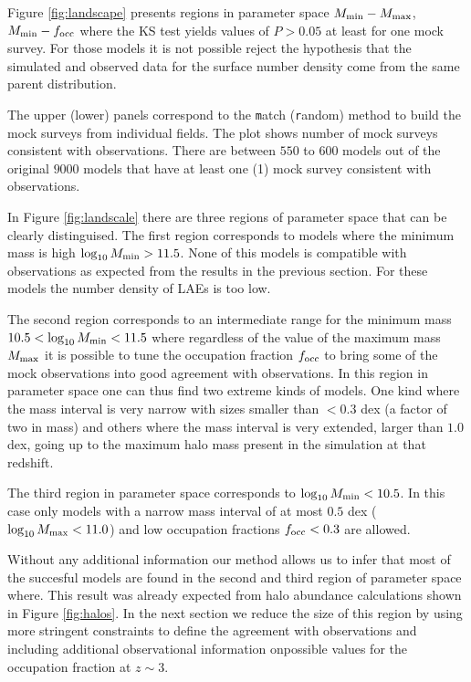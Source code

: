 \documentclass[usenatbib]{mn2e}
\begin{document}
Figure \ref{fig:landscape} presents regions in parameter space $M_{\rm
min}-M_{\rm max}$, $M_{\rm min}-f_{\rm occ}$ where the KS test yields
values of $P>0.05$ at least for one mock survey. For those models it
is not possible reject the hypothesis that the simulated and observed
data for the surface number density come from the same parent
distribution.

The upper (lower) panels correspond to the {\texttt match} ({\texttt
  random}) method to build the mock surveys from individual
fields. The plot shows number of mock surveys consistent
with observations. There are between $550$ to $600$ models out of the
original $9000$ models that have at least one (1) mock survey
consistent with observations. 


In Figure \ref{fig:landscale} there are three regions of parameter
space that can be clearly distinguised. The first region corresponds
to models where the minimum mass is high $\log_{10}M_{\rm min}>
11.5$. None of this models is compatible with observations as expected
from the results in the previous section. For these models the number
density of LAEs is too low. 

The second region corresponds to an intermediate range for the minimum
mass $10.5<\log_{10}M_{\rm min}<11.5$ where regardless of the value of
the maximum mass $M_{\rm max}$ it is possible to tune the occupation
fraction $f_{\rm occ}$ to bring some of the mock observations into
good agreement with observations. In this region in parameter space
one can thus find two extreme kinds of models.  One kind where the
mass interval is very narrow with sizes smaller than $<0.3$ dex (a
factor of two in mass) and others where the mass interval is very
extended, larger than $1.0$ dex, going up to the maximum halo mass
present in the simulation at that redshift. 


The third region in parameter space corresponds to $\log_{10}M_{\rm
  min}<10.5$. In this case only models with a narrow mass interval of
at most $0.5$ dex ($\log_{10}M_{\rm max}<11.0$) and low
occupation fractions $f_{\rm occ}<0.3$ are allowed. 

Without any additional information our method allows us to infer that
most of the succesful models are found in the second and third region of
parameter space where. This result was already expected from halo
abundance calculations shown in Figure \ref{fig:halos}. In the next
section we reduce the size of this region by using more stringent
constraints to define the agreement with observations and including
additional observational information onpossible values for the
occupation fraction at $z\sim 3$. 
\end{document}
